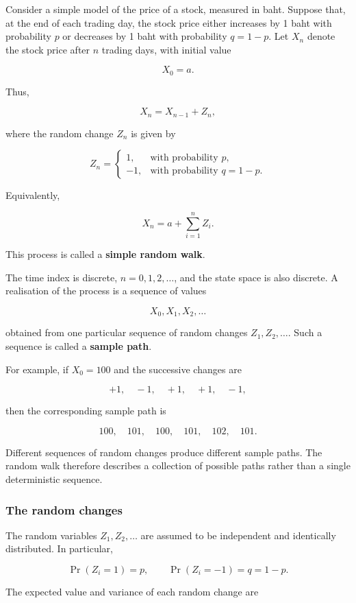 \documentclass[
  letterpaper,
  DIV=11,
  numbers=noendperiod]{scrartcl}
\theoremstyle{definition}
\theoremstyle{remark}
\begin{document}
Consider a simple model of the price of a stock, measured in baht.
Suppose that, at the end of each trading day, the stock price either
increases by 1 baht with probability \(p\) or decreases by 1 baht with
probability \(q=1-p\). Let \(X_n\) denote the stock price after \(n\)
trading days, with initial value

\[
X_0=a.
\]

Thus,

\[
X_n=X_{n-1}+Z_n,
\]

where the random change \(Z_n\) is given by

\[
Z_n=
\begin{cases}
1, & \text{with probability }p,\\
-1, & \text{with probability }q=1-p.
\end{cases}
\]

Equivalently,

\[
X_n=a+\sum_{i=1}^n Z_i.
\]

This process is called a \textbf{simple random walk}.

The time index is discrete, \(n=0,1,2,\ldots\), and the state space is
also discrete. A realisation of the process is a sequence of values

\[
X_0,X_1,X_2,\ldots
\]

obtained from one particular sequence of random changes
\(Z_1,Z_2,\ldots\). Such a sequence is called a \textbf{sample path}.

For example, if \(X_0=100\) and the successive changes are

\[
+1,\quad -1,\quad +1,\quad +1,\quad -1,
\]

then the corresponding sample path is

\[
100,\quad 101,\quad 100,\quad 101,\quad 102,\quad 101.
\]

Different sequences of random changes produce different sample paths.
The random walk therefore describes a collection of possible paths
rather than a single deterministic sequence.

\subsubsection{The random changes}\label{the-random-changes}

The random variables \(Z_1,Z_2,\ldots\) are assumed to be independent
and identically distributed. In particular,

\[
\Pr(Z_i=1)=p,
\qquad
\Pr(Z_i=-1)=q=1-p.
\]

The expected value and variance of each random change are
\end{document}
